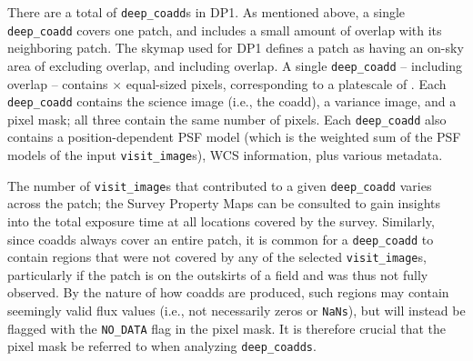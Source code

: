 There are a total of \ndeepcoadds \texttt{deep\_coadd}s in \gls{DP1}.
As mentioned above, a single \texttt{deep\_coadd} covers one \gls{patch}, and includes a small amount of overlap with its neighboring \gls{patch}.
The skymap used for \gls{DP1} defines a \gls{patch} as having an on-sky area of \innerpatcharea excluding overlap, and \outerpatcharea including overlap.
A single \texttt{deep\_coadd} -- including overlap -- contains \ndeepcoaddpixx $\times$ \ndeepcoaddpixy equal-sized pixels, corresponding to a platescale of \rawplatescale.
Each \texttt{deep\_coadd} contains the science image (i.e., the coadd), a variance image, and a pixel mask; all three contain the same number of pixels.
Each \texttt{deep\_coadd} also contains a position-dependent \gls{PSF} model (which is the weighted sum of the \gls{PSF} models of the input \texttt{visit\_image}s), \gls{WCS} information, plus various \gls{metadata}.

The number of \texttt{visit\_image}s that contributed to a given \texttt{deep\_coadd} varies across the patch; the Survey Property Maps can be consulted to gain insights into the total exposure time at all locations covered by the survey.
Similarly, since coadds always cover an entire \gls{patch}, it is common for a \texttt{deep\_coadd} to contain regions that were not covered by any of the selected \texttt{visit\_image}s, particularly if the \gls{patch} is on the outskirts of a field and was thus not fully observed.
By the nature of how coadds are produced, such regions may contain seemingly valid \gls{flux} values (i.e., not necessarily zeros or \texttt{NaNs}), but will instead be flagged with the \texttt{NO\_DATA} flag in the pixel mask.
It is therefore crucial that the pixel mask be referred to when analyzing \texttt{deep\_coadds}.

